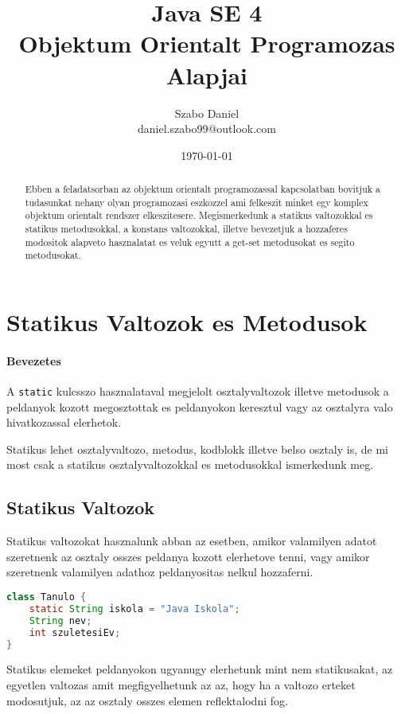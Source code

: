 \documentclass{article}
\title{%
Java SE 4 \\
\large Objektum Orientalt Programozas Alapjai}
\author{Szabo Daniel\\daniel.szabo99@outlook.com}
\date{\today}
\let\l\lstinline
\begin{document}
\maketitle
\begin{abstract}
Ebben a feladatsorban az objektum orientalt programozassal kapcsolatban bovitjuk a tudasunkat nehany olyan programozasi eszkozzel ami felkeszit minket egy komplex objektum orientalt rendszer elkeszitesere. Megismerkedunk a statikus valtozokkal es statikus metodusokkal, a konstans valtozokkal, illetve bevezetjuk a hozzaferes modositok alapveto hasznalatat es veluk egyutt a get-set metodusokat es segito metodusokat.
\end{abstract}

\newpage

\tableofcontents{}

\newpage

\section{Statikus Valtozok es Metodusok}
\paragraph{Bevezetes}

A \l{static} kulcsszo hasznalataval megjelolt osztalyvaltozok illetve metodusok a peldanyok kozott megosztottak es
peldanyokon keresztul vagy az osztalyra valo hivatkozassal elerhetok.

Statikus lehet osztalyvaltozo, metodus, kodblokk illetve belso osztaly is, de mi most csak a statikus
osztalyvaltozokkal es metodusokkal ismerkedunk meg.

\subsection{Statikus Valtozok}
Statikus valtozokat hasznalunk abban az esetben, amikor valamilyen adatot szeretnenk az osztaly osszes peldanya
kozott elerhetove tenni, vagy amikor szeretnenk valamilyen adathoz peldanyositas nelkul hozzaferni.

\begin{lstlisting}[language=Java, caption=Pelda statikus valtozo]
class Tanulo {
    static String iskola = "Java Iskola";
    String nev;
    int szuletesiEv;
}
\end{lstlisting}

Statikus elemeket peldanyokon ugyanugy elerhetunk mint nem statikusakat, az egyetlen valtozas amit megfigyelhetunk az
az, hogy ha a valtozo erteket modosutjuk, az az osztaly osszes elemen reflektalodni fog.
\end{document}
